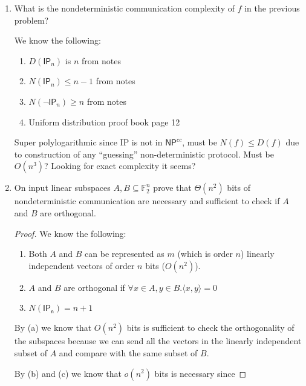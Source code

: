 \documentclass[usletter]{article}
\begin{document}
\begin{enumerate}
\begin{proof}
      From the definition and (a) $f$ has can be seen as $\left [ \sum_{i=1}^{n} x_i y_i \right ]$ in $\mathbb{F}_{18181}$. Then by (b) and (c) we know that $M_f$ has rank $n$ and taken with (d) this implies that the size of the fooling set is certainly no greater than $n^3$.
    \end{proof}


  \item What is the nondeterministic communication complexity of $f$ in the previous problem?

    We know the following:

    \begin{enumerate}
      \item $D(\mathsf{IP}_n)$ is $n$ from notes
      \item $N(\mathsf{IP}_n) \leq n - 1$ from notes
      \item $N(\mathsf{\lnot IP}_n) \geq n$ from notes
      \item Uniform distribution proof book page 12
    \end{enumerate}

    Super polylogarithmic since IP is not in $\mathsf{NP}^{cc}$, must be  $N(f) \leq D(f)$ due to construction of any ``guessing'' non-deterministic protocol. Must be $O(n^3)$? Looking for exact complexity it seems?

  \item On input linear subspaces $A, B \subseteq \mathbb{F}_2^n$ prove that $\Theta(n^2)$ bits of nondeterministic communication are necessary and sufficient to check if $A$ and $B$ are orthogonal.

    \begin{proof}
      We know the following:

      \begin{enumerate}
        \item Both $A$ and $B$ can be represented as $m$ (which is order $n$) linearly independent vectors of order $n$ bits ($O(n^2)$).
        \item $A$ and $B$ are orthogonal if $\forall x \in A, y \in B. \langle x, y \rangle = 0$ \cite{orthsub}
        \item $N(\mathsf{IP_n}) = n + 1$
      \end{enumerate}

      By (a) we know that $O(n^2)$ bits is sufficient to check the orthogonality of the subspaces because we can send all the vectors in the linearly independent subset of $A$ and compare with the same subset of $B$.

      By (b) and (c) we know that $o(n^2)$ bits is necessary since

    \end{proof}

\end{enumerate}

\newpage



\end{document}
